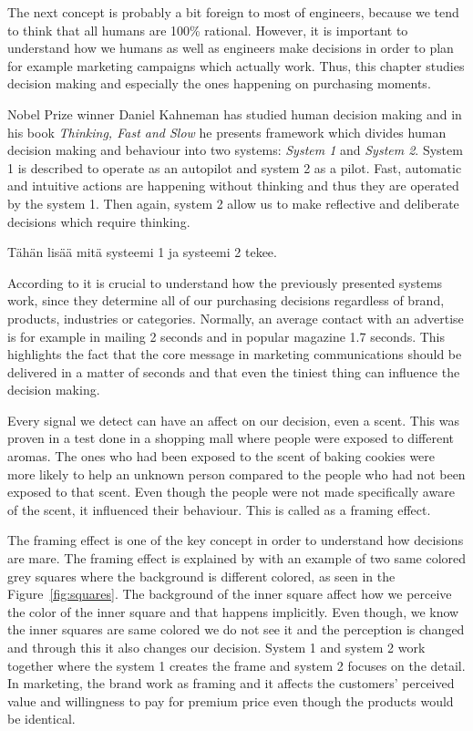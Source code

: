 The next concept is probably a bit foreign to most of engineers, because we tend to think that all humans are 100\% rational. However, it is important to understand how we humans as well as engineers make decisions in order to plan for example marketing campaigns which actually work. Thus, this chapter studies decision making and especially the ones happening on purchasing moments.

Nobel Prize winner Daniel Kahneman has studied human decision making and in his book \emph{Thinking, Fast and Slow} he presents framework which divides human decision making and behaviour into two systems: \emph{System 1} and \emph{System 2}. System 1 is described to operate as an autopilot and system 2 as a pilot. Fast, automatic and intuitive actions are happening without thinking and thus they are operated by the system 1. Then again, system 2 allow us to make reflective and deliberate decisions which require thinking.

Tähän lisää mitä systeemi 1 ja systeemi 2 tekee.

According to \textcite{Decoded:2013} it is crucial to understand how the previously presented systems work, since they determine all of our purchasing decisions regardless of brand, products, industries or categories. Normally, an average contact with an advertise is for example in mailing 2 seconds and in popular magazine 1.7 seconds. This highlights the fact that the core message in marketing communications should be delivered in a matter of seconds and that even the tiniest thing can influence the decision making.

Every signal we detect can have an affect on our decision, even a scent. This was proven in a test done in a shopping mall where people were exposed to different aromas. The ones who had been exposed to the scent of baking cookies were more likely to help an unknown person compared to the people who had not been exposed to that scent. Even though the people were not made specifically aware of the scent, it influenced their behaviour. This is called as a framing effect. \parencite{Decoded:2013}

The framing effect is one of the key concept in order to understand how decisions are mare. The framing effect is explained by \textcite{Decoded:2013} with an example of two same colored grey squares where the background is different colored, as seen in the Figure~\ref{fig:squares}. The background of the inner square affect how we perceive the color of the inner square and that happens implicitly. Even though, we know the inner squares are same colored we do not see it and the perception is changed and through this it also changes our decision. System 1 and system 2 work together where the system 1 creates the frame and system 2 focuses on the detail. In marketing, the brand work as framing and it affects the customers' perceived value and willingness to pay for premium price even though the products would be identical. \parencite{Decoded:2013}

